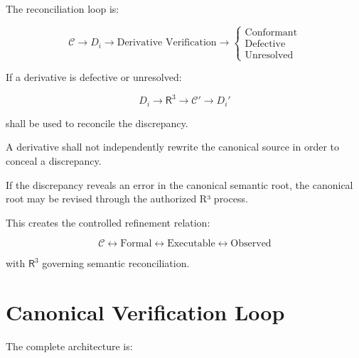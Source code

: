 \documentclass[11pt]{article}
\newcommand{\Rthree}{\ensuremath{\mathsf{R}^{3}}}
\newcommand{\Spec}{\mathcal{C}}
\begin{document}
The reconciliation loop is:

\[
\boxed{
\Spec
\rightarrow
D_i
\rightarrow
\text{Derivative Verification}
\rightarrow
\begin{cases}
\text{Conformant}\\
\text{Defective}\\
\text{Unresolved}
\end{cases}
}
\]

If a derivative is defective or unresolved:

\[
\boxed{
D_i
\rightarrow
\Rthree
\rightarrow
\Spec'
\rightarrow
D_i'
}
\]

shall be used to reconcile the discrepancy.

A derivative shall not independently rewrite the canonical source
in order to conceal a discrepancy.

If the discrepancy reveals an error in the canonical semantic
root, the canonical root may be revised through the authorized
R³ process.

This creates the controlled refinement relation:

\[
\boxed{
\Spec
\leftrightarrow
\text{Formal}
\leftrightarrow
\text{Executable}
\leftrightarrow
\text{Observed}
}
\]

with \Rthree{} governing semantic reconciliation.

\section{Canonical Verification Loop}

The complete architecture is:
\end{document}
